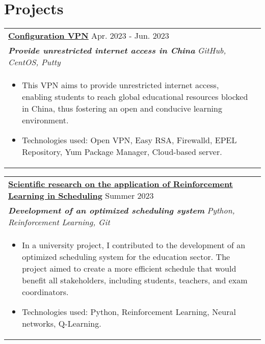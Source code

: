 \documentclass[a4paper,8pt]{article}
\begin{document}
\section{Projects}
\begin{tabularx}{\linewidth}{ @{}l r@{} }
\color[HTML]{1C033C} \textbf{\uline{\href{https://github.com/tuephan171611}{Configuration VPN}}} \hfill \color[HTML]{371e77} Apr. 2023 - Jun. 2023 \\[4pt]
\color[HTML]{371e77}\textbf{\textit{Provide unrestricted internet access in China}} \hfill \color[HTML]{4B28A4} \textit{GitHub, CentOS, Putty} \\[5pt]
\begin{minipage}[t]{\linewidth}
    \begin{itemize}[nosep,after=\strut, leftmargin=2em, itemsep=2pt]
        \item This VPN aims to provide unrestricted internet access, enabling students to reach global educational resources blocked in China, thus fostering an open and conducive learning environment.
        \item Technologies used: Open VPN, Easy RSA, Firewalld, EPEL Repository, Yum Package Manager, Cloud-based server.
    \end{itemize}
    \end{minipage}
\end{tabularx}

\begin{tabularx}{\linewidth}{ @{}l r@{} }
\color[HTML]{1C033C} \textbf{\uline{\href{https://github.com/tuephan171611}{Scientific research on the application of Reinforcement Learning in Scheduling}}} \hfill \color[HTML]{371e77} Summer 2023\\[4pt]
\color[HTML]{371e77}\textbf{\textit{Development of an optimized scheduling system
}} \hfill \color[HTML]{4B28A4} \textit{Python, Reinforcement Learning, Git} \\[5pt]
\begin{minipage}[t]{\linewidth}
    \begin{itemize}[nosep,after=\strut, leftmargin=2em, itemsep=2pt]
        \item In a university project, I contributed to the development of an optimized scheduling system for the education sector. The project aimed to create a more efficient schedule that would benefit all stakeholders, including students, teachers, and exam coordinators.
        \item Technologies used: Python, Reinforcement Learning, Neural networks,
        Q-Learning.
    \end{itemize}
    \end{minipage}
\end{tabularx}
\end{document}
